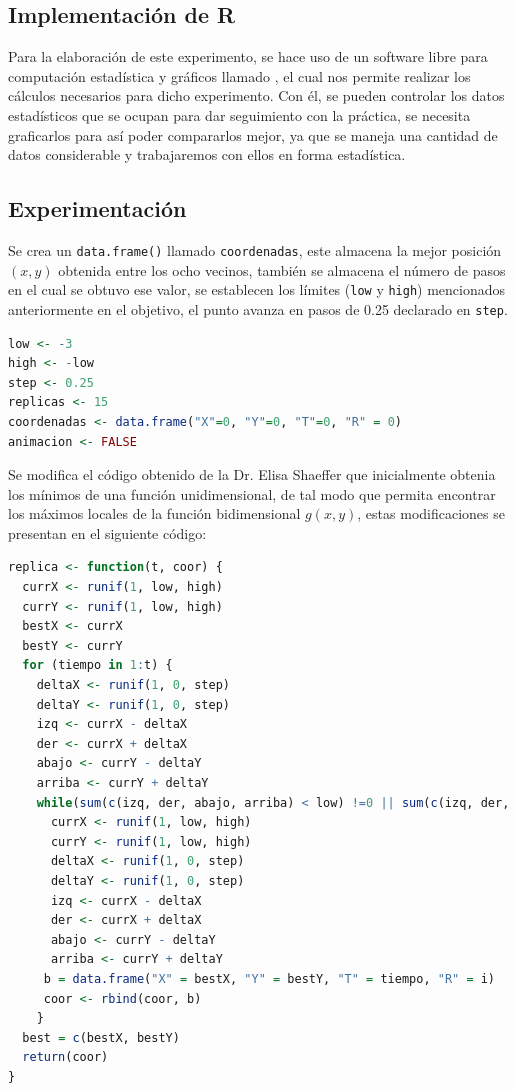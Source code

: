 \documentclass{article}
\begin{document}
\newpage

\subsection{Implementaci\'on de R}
Para la elaboraci\'on de este experimento, se hace uso de un software libre para computaci\'on estad\'istica y gr\'aficos llamado \citet{R}, el cual nos permite realizar los c\'alculos necesarios para dicho experimento. Con \'el, se pueden controlar los datos estad\'isticos que se ocupan para dar seguimiento con la pr\'actica, se necesita graficarlos para as\'i poder compararlos mejor, ya que se maneja una cantidad de datos considerable y trabajaremos con ellos en forma estad\'istica.

\subsection{Experimentaci\'on}

Se crea un \texttt{data.frame()} llamado \texttt{coordenadas}, este almacena la mejor posici\'on $(x,y)$ obtenida entre los ocho vecinos, tambi\'en se almacena el n\'umero de pasos en el cual se obtuvo ese valor, se establecen los l\'imites (\texttt{low} y \texttt{high}) mencionados anteriormente en el objetivo, el punto avanza en pasos de 0.25 declarado en \texttt{step}.

\begin{lstlisting}[language=R]
low <- -3
high <- -low
step <- 0.25
replicas <- 15
coordenadas <- data.frame("X"=0, "Y"=0, "T"=0, "R" = 0)
animacion <- FALSE
\end{lstlisting}

Se modifica el c\'odigo obtenido de la Dr. Elisa Shaeffer \cite{SatuP7} que inicialmente obtenia los m\'inimos de una funci\'on unidimensional, de tal modo que permita encontrar los m\'aximos locales de la funci\'on bidimensional $g(x,y)$, estas modificaciones se presentan en el siguiente c\'odigo:

\begin{lstlisting}[language=R]
replica <- function(t, coor) {
  currX <- runif(1, low, high) 
  currY <- runif(1, low, high)
  bestX <- currX
  bestY <- currY
  for (tiempo in 1:t) {
    deltaX <- runif(1, 0, step)
    deltaY <- runif(1, 0, step)
    izq <- currX - deltaX
    der <- currX + deltaX
    abajo <- currY - deltaY
    arriba <- currY + deltaY
    while(sum(c(izq, der, abajo, arriba) < low) !=0 || sum(c(izq, der, abajo, arriba) > high) != 0){
      currX <- runif(1, low, high) 
      currY <- runif(1, low, high)
      deltaX <- runif(1, 0, step)
      deltaY <- runif(1, 0, step)
      izq <- currX - deltaX
      der <- currX + deltaX
      abajo <- currY - deltaY
      arriba <- currY + deltaY 
     b = data.frame("X" = bestX, "Y" = bestY, "T" = tiempo, "R" = i)
     coor <- rbind(coor, b)
    }
  best = c(bestX, bestY)
  return(coor)
}
\end{lstlisting}
\end{document}
